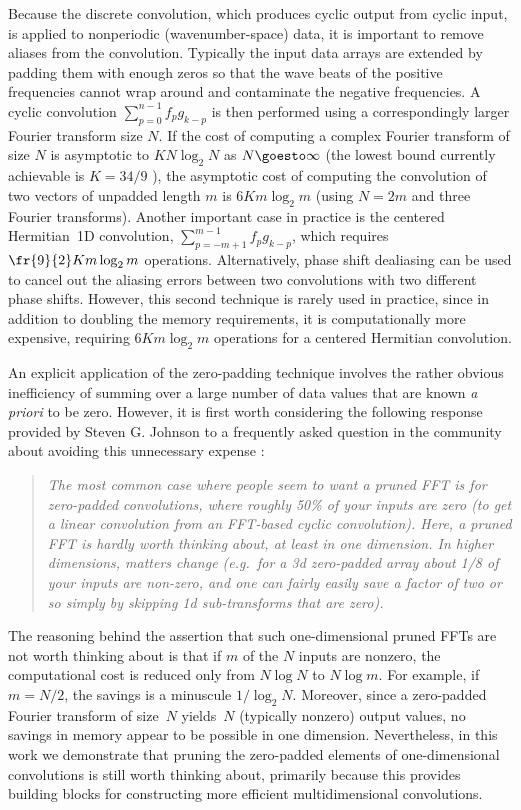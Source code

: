 \documentclass[final]{siamltex}
\begin{document}
Because the discrete convolution, which produces cyclic output from cyclic
input, is applied to nonperiodic (wavenumber-space) data, it is important
to remove aliases from the convolution. Typically the input data arrays are
extended by padding them with enough zeros so that the wave beats of
the positive frequencies cannot wrap around and contaminate
the negative frequencies. A cyclic convolution $\sum_{p=0}^{n-1} f_p g_{k-p}$ 
is then performed using a
correspondingly larger Fourier transform size $N$. If the cost of 
computing a complex Fourier transform of size $N$ is asymptotic to 
$K N\log_2 N$ as \hbox{$N\goesto\infty$} (the lowest bound currently 
achievable is $K=34/9$ \cite{Johnson07,Lundy07}), the asymptotic cost of
computing the convolution of two vectors of unpadded length $m$ is
$6Km\log_2 m$ (using $N=2m$ and three Fourier transforms).
Another important case in practice is the centered Hermitian~1D convolution,
$\sum_{p=-m+1}^{m-1} f_p g_{k-p}$, which requires $\fr{9}{2}Km\log_2 m$
operations.
Alternatively, phase shift dealiasing \cite{Patterson71,Canuto06} can be used
to cancel out the aliasing errors between two convolutions with two
different phase shifts. However, this second technique is rarely used in
practice, since in addition to doubling the memory requirements, it is
computationally more expensive, requiring $6K m\log_2 m$ operations for a 
centered Hermitian convolution.

An explicit application of the zero-padding technique involves the rather
obvious inefficiency of summing over a large number of data values that
are known {\it a priori\/} to be zero.
However, it is first worth considering the following response
provided by Steven G. Johnson to a frequently asked question in the
community about avoiding this unnecessary
expense \cite{fftwprune}:
\begin{quotation}\label{quote}
{\it
The most common case where people seem to want a pruned FFT is for
zero-padded convolutions, where roughly 50\% of your inputs are zero (to
get a linear convolution from an FFT-based cyclic convolution). Here, a
pruned FFT is hardly worth thinking about, at least in one dimension. In
higher dimensions, matters change (e.g.\ for a 3d zero-padded array about
1/8 of your inputs are non-zero, and one can fairly easily save a factor of
two or so simply by skipping 1d sub-transforms that are zero).
}
\end{quotation}

The reasoning behind the assertion that such one-dimensional pruned FFTs
are not worth thinking about is that if $m$ of the $N$ inputs are nonzero,
the computational cost is reduced only from $N\log N$ to $N\log m$.
For example, if $m=N/2$, the savings is a minuscule $1/\log_2 N$.
Moreover, since a zero-padded Fourier transform of size~$N$ yields~$N$
(typically nonzero) output values, no savings in memory appear to be
possible in one dimension. Nevertheless, in this work we demonstrate that
pruning the zero-padded elements of one-dimensional convolutions is still
worth thinking about, primarily because this provides building blocks
for constructing more efficient multidimensional convolutions.
\end{document}
